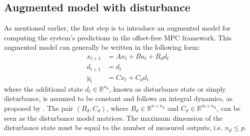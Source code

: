\documentclass[a4paper,12pt,oneside]{book}
\begin{document}
\subsection*{Augmented model with disturbance}
As mentioned earlier, the first step is to introduce an augmented model for computing the system's predictions in the offset-free MPC framework. 
This augmented model can generally be written in the following form:
\begin{equation}
\begin{aligned}
    x_{t+1} &= A x_t + B u_t + B_d d_t \\
    d_{t+1} &= d_t \\
    y_t &= C x_t + C_d d_t
\end{aligned}
\label{Augmented_model}
\end{equation}
where the additional state $d_t \in \mathbb{R}^{n_d}$, known as disturbance state or simply disturbance, is assumed to be constant and follows an integral dynamics, as proposed by \cite{pannocchia2003disturbance}. 
The pair $(B_d, C_d)$, where $B_d \in \mathbb{R}^{n \times n_d}$ and $C_d \in \mathbb{R}^{m \times n_d}$, can be seen as the disturbance model matrices.
The maximum dimension of the disturbance state must be equal to the number of measured outputs, i.e. $n_d \leq p$.
\end{document}
